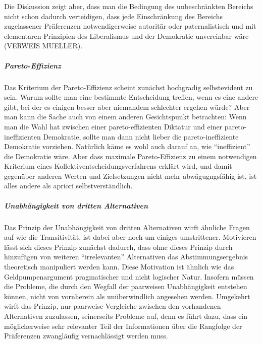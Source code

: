 Die Diskussion zeigt aber, dass man die Bedingung des unbeschränkten Bereichs
nicht schon dadurch verteidigen, dass jede Einschränkung des Bereichs
zugelassener Präferenzen notwendigerweise autoritär oder paternalistisch 
und mit elementaren Prinzipien des Liberalismus und der Demokratie unvereinbar
wäre (VERWEIS MUELLER).

\subparagraph{Pareto-Effizienz}

Das Kriterium der Pareto-Effizienz scheint zunächst hochgradig selbstevident zu
sein. Warum sollte man eine bestimmte Entscheidung treffen, wenn es eine andere
gibt, bei der es einigen besser aber niemandem schlechter ergehen würde? Aber
man kann die Sache auch von einem anderen Gesichtspunkt betrachten: Wenn man
die Wahl hat zwischen einer pareto-effizienten Diktatur und einer
pareto-ineffizienten Demokratie, sollte man dann nicht lieber die
pareto-ineffiziente Demokratie vorziehen. Natürlich käme es wohl auch darauf
an, wie "`ineffizient"' die Demokratie wäre. 
 Aber dass maximale
Pareto-Effizienz zu einem notwendigen Kriterium eines
Kollektiventscheidungsverfahrens erklärt wird, und damit gegenüber anderen
Werten und Zielsetzungen nicht mehr abwägugngsfähig ist, ist alles andere als
apriori selbstverständlich. 

\subparagraph{Unabhängigkeit von dritten Alternativen}

Das Prinzip der Unabhängigkeit von dritten Alternativen wirft ähnliche Fragen
auf wie die Transitivität, ist dabei aber noch um einiges umstrittener.
Motivieren lässt sich dieses Prinzip zunächst dadurch, dass ohne dieses Prinzip
durch hinzufügen von weiteren "`irrelevanten"' Alternativen das
Abstimmungsergebnis theoretisch manipuliert werden kann. Diese Motivation ist
ähnlich wie das Geldpumpenargument pragmatischer und nicht logischer Natur.
Insofern müssen die Probleme, die durch den Wegfall der paarweisen
Unabhängigkeit entstehen können, nicht von vornherein als unüberwindlich
angesehen werden. Umgekehrt wirft das Prinzip, nur paarweise Vergleiche zwischen
den vorhandenen Alternativen zuzulassen, seinerseits Probleme auf, denn es führt
dazu, dass ein möglicherweise sehr relevanter Teil der Informationen über die
Rangfolge der Präferenzen zwangläufig vernachlässigt werden muss.

